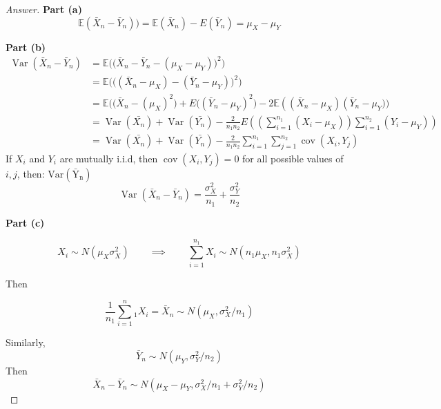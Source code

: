 \documentclass{article}
\theoremstyle{definition}
\newcommand{\qiq}{\qquad \implies \qquad}
\begin{document}
\begin{proof}[Answer]
 \textbf{Part (a)}
 $$\mathbb{E}(\bar{X}_n - \bar{Y}_n)) = \mathbb{E}(\bar{X}_n) -E(\bar{Y}_n)= \mu_X -\mu_Y$$

\textbf{Part (b)}
\begin{align*}
    \operatorname{Var} ( \bar{X}_n - \bar{Y}_n)&= \mathbb{E}\Big(\big(\bar{X}_n - \bar{Y}_n - (\mu_X -\mu_Y)\big)^2\Big) \\
                            &= \mathbb{E}\Big(\big( (\bar{X}_n - \mu_X)-( \bar{Y}_n -\mu_Y)\big)^2\Big)\\
                            &= \mathbb{E}\big((\bar{X}_n - (\mu_X) ^2\big)+E\big((\bar{Y}_n - \mu_Y) ^2\big) - 2 \mathbb{E}\left(\left(\bar{X}_n - \mu_X\right) \left(\bar{Y}_n - \mu_Y) \big)\\
                            &= \operatorname{Var}(\bar{X_n})+\operatorname{Var}(\bar{Y_n}) - \frac{2}{n_1 n_2} E\left(\left(\sum_{i=1}^{n_1} \left(X_i-\mu_X\right)\right)\sum_{i=1}^{n_2} \left(Y_i-\mu_Y\right)\right)\\
                            &= \operatorname{Var}(\bar{X_n})+\operatorname{Var}(\bar{Y_n}) - \frac{2}{n_1 n_2} \sum_{i=1}^{n_1}\sum_{j=1}^{n_2} \operatorname{cov} (X_i,Y_j)
\end{align*}
If $X_i$ and $Y_i$ are mutually i.i.d, then $\operatorname{cov} (X_i,Y_j) = 0$ for all possible values of $i,j$, then: $\operatorname{Var(\bar{Y}_n)}$ 
$$\operatorname{Var} ( \bar{X}_n - \bar{Y}_n) = \frac{\sigma_X^2}{n_1}+\frac{\sigma_Y^2}{n_2}$$

\textbf{Part (c)}

$$X_{i} \sim N\left(\mu_{X} \sigma_{X}^{2}\right) \qiq \sum_{i=1}^{n_1} X_{i} \sim N\left(n_1\mu_{X},n_1 \sigma_{X}^{2}\right)$$

Then

$$\frac{1}{n_1}\sum_{i=1}^n_1 X_{i}=\bar{X}_n \sim N\left(\mu_{X}, \sigma_{X}^{2}/n_1\right)$$

Similarly, 
$$\bar{Y}_n \sim N\left(\mu_{Y}, \sigma_{Y}^{2}/n_2\right)$$
Then
$$\bar{X}_n-\bar{Y}_n \sim N\left(\mu_X-\mu_{Y},  \sigma_{X}^{2}/n_1+\sigma_{Y}^{2}/n_2\right)$$
\end{proof}
\end{document}
